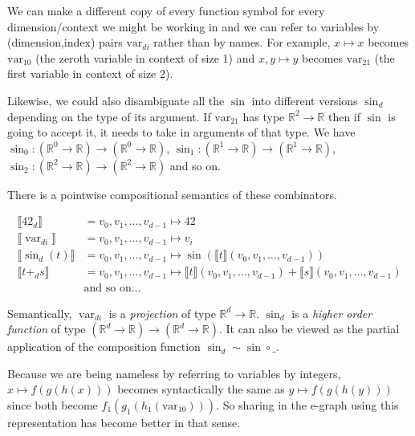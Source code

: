 \documentclass{article}%
\newcommand{\bR}{\mathbb{R}}
\begin{document}
We can make a different copy of every function symbol for every dimension/context we might be working in and we can refer to variables by (dimension,index) pairs $\text{var}_{di}$ rather than by names. For example, $x \mapsto x$ becomes $\text{var}_{10}$ (the zeroth variable in context of size 1) and $x,y \mapsto y$ becomes $\text{var}_{21}$ (the first variable in context of size 2).

Likewise, we could also disambiguate all the $\sin$ into different versions $\sin_d$ depending on the type of its argument. If $\text{var}_{21}$ has type $\bR^2 \rightarrow \bR$ then if $\sin$ is going to accept it, it needs to take in arguments of that type. We have $\sin_0 : (\bR^0 \rightarrow \bR) \rightarrow (\bR^0 \rightarrow \bR)$, $\sin_1 : (\bR^1 \rightarrow \bR) \rightarrow (\bR^1 \rightarrow \bR)$,  $\sin_2 : (\bR^2 \rightarrow \bR) \rightarrow (\bR^2 \rightarrow \bR)$ and so on.

There is a pointwise compositional semantics of these combinators. 

\[
\begin{aligned}
\llbracket 42_d \rrbracket &= v_0, v_1, \ldots, v_{d-1} \mapsto 42 \\
\llbracket \operatorname{var}_{di} \rrbracket &= v_0, v_1, \ldots, v_{d-1} \mapsto v_i \\
\llbracket \sin_d(t) \rrbracket &= v_0, v_1, \ldots, v_{d-1} \mapsto \sin(\llbracket t \rrbracket(v_0, v_1, \ldots, v_{d-1})) \\
\llbracket t +_d s \rrbracket &= v_0, v_1, \ldots, v_{d-1} \mapsto \llbracket t \rrbracket(v_0, v_1, \ldots, v_{d-1}) + \llbracket s \rrbracket(v_0, v_1, \ldots, v_{d-1}) \\
&\text{and so on...}
\end{aligned}
\]

Semantically, $\operatorname{var}_{di}$ is a \emph{projection} of type $\mathbb{R}^d \rightarrow \mathbb{R}$. $\sin_d$ is a \emph{higher order function} of type $(\mathbb{R}^d \rightarrow \mathbb{R}) \rightarrow (\mathbb{R}^d \rightarrow \mathbb{R})$. It can also be viewed as the partial application of the composition function $\sin_d \sim \sin \circ \_$.

Because we are being nameless by referring to variables by integers, $x \mapsto f(g(h(x)))$ becomes syntactically the same as $y \mapsto f(g(h(y)))$ since both become $f_1(g_1(h_1(\text{var}_{10})))$. So sharing in the e-graph using this representation has become better in that sense.
\end{document}
